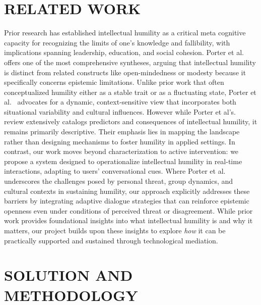\documentclass[journal]{IEEEtran}
\begin{document}
\section{RELATED WORK}
Prior research has established intellectual humility as a critical meta cognitive capacity for recognizing the limits of one’s knowledge and fallibility, with implications spanning leadership, education, and social cohesion. Porter et al.~\cite{porter2022} offers one of the most comprehensive syntheses, arguing that intellectual humility is distinct from related constructs like open-mindedness or modesty because it specifically concerns epistemic limitations. Unlike prior work that often conceptualized humility either as a stable trait or as a fluctuating state, Porter et al.~\cite{porter2022} advocates for a dynamic, context-sensitive view that incorporates both situational variability and cultural influences.
However while Porter et al's.~\cite{porter2022} review extensively catalogs predictors and consequences of intellectual humility, it remains primarily descriptive. Their emphasis lies in mapping the landscape rather than designing mechanisms to foster humility in applied settings. In contrast, our work moves beyond characterization to active intervention: we propose a system designed to operationalize intellectual humility in real-time interactions, adapting to users' conversational cues. Where Porter et al. underscores the challenges posed by personal threat, group dynamics, and cultural contexts in sustaining humility, our approach explicitly addresses these barriers by integrating adaptive dialogue strategies that can reinforce epistemic openness even under conditions of perceived threat or disagreement.
While prior work provides foundational insights into what intellectual humility is and why it matters, our project builds upon these insights to explore \emph{how} it can be practically supported and sustained through technological mediation.
\section{SOLUTION AND METHODOLOGY}
\label{section:solution-methodology}
\end{document}
